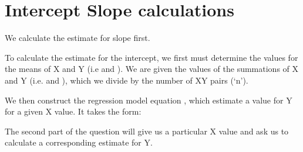 \documentclass{beamer}
\begin{document}
\section{Intercept Slope calculations}
\begin{frame}
We calculate the estimate for slope first.

To calculate the estimate for the intercept, we first must determine the values for the means of X and Y (i.e  and ). We are given the values of the summations of X and Y (i.e. and ), which we divide by the number of XY pairs (‘n’). 
\end{frame}
\begin{frame}
We then construct the regression model equation , which estimate a value for Y for a  given X value. It takes the form:	

The second part of the question will give us a particular X value and ask us to calculate a corresponding estimate for Y.

\end{frame}
\end{document}
